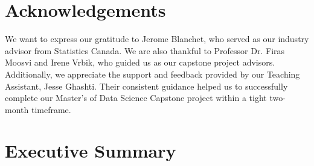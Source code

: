 \documentclass[11pt, a4paper]{article}
\begin{document}
\pagebreak



\thispagestyle{empty}
\setcounter{tocdepth}{2} %
{
  \hypersetup{linkcolor=black}
  \tableofcontents
}
\thispagestyle{empty}

\pagebreak
\thispagestyle{empty}
{
  \hypersetup{linkcolor=black}
  \small
  \listoffigures
}
\thispagestyle{empty}

\vspace{2pc}

\pagebreak
\thispagestyle{empty}
{
  \hypersetup{linkcolor=black}
  \listoftables
}
\pagebreak



\thispagestyle{empty}
\section*{Acknowledgements}

We want to express our gratitude to Jerome Blanchet, who served as our industry advisor from Statistics Canada. We are also thankful to Professor Dr. Firas Moosvi and Irene Vrbik, who guided us as our capstone project advisors. Additionally, we appreciate the support and feedback provided by our Teaching Assistant, Jesse Ghashti. Their consistent guidance helped us to successfully complete our Master's of Data Science Capstone project within a tight two-month timeframe.







\pagebreak
\section{Executive Summary}
\par

\fancyhf{}
\setcounter{page}{1}
\lhead{\thepage}
\end{document}
